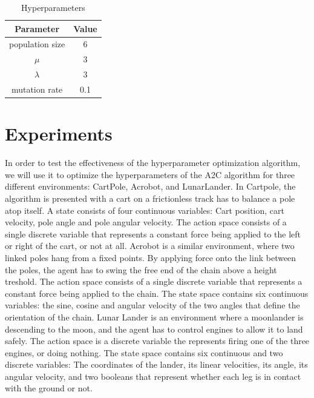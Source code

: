 \documentclass{article}
\begin{document}
\begin{table}[htbp]
    \centering
    \begin{tabular}
        {|c|c|}
        \toprule
        \textbf{Parameter} & \textbf{Value} \\
        \midrule
        population size & 6 \\
        $\mu$           & 3 \\
        $\lambda$       & 3 \\
        mutation rate   & 0.1 \\
        \bottomrule
    \end{tabular}
    \caption{Hyperparameters}
    \label{tab:hyper}
\end{table}

\section{Experiments}
\label{sec:exp}

In order to test the effectiveness of the hyperparameter optimization algorithm, we will use it to optimize the hyperparameters of the A2C algorithm for three different environments: CartPole, Acrobot, and LunarLander.
In Cartpole, the algorithm is presented with a cart on a frictionless track has to balance a pole atop itself. 
A state consists of four continuous variables: Cart position, cart velocity, pole angle and pole angular velocity. 
The action space consists of a single discrete variable that represents a constant force being applied to the left or right of the cart, or not at all. 
Acrobot is a similar environment, where two linked poles hang from a fixed points. 
By applying force onto the link between the poles, the agent has to swing the free end of the chain above a height treshold. 
The action space consists of a single discrete variable that represents a constant force being applied to the chain. 
The state space contains six continuous variables: the sine, cosine and angular velocity of the two angles that define the orientation of the chain. 
Lunar Lander is an environment where a moonlander is descending to the moon, and the agent has to control engines to allow it to land safely. 
The action space is a discrete variable the represents firing one of the three engines, or doing nothing. 
The state space contains six continuous and two discrete variables: The coordinates of the lander, its linear velocities, its angle, its angular velocity, and two booleans that represent whether each leg is in contact with the ground or not.
\end{document}
